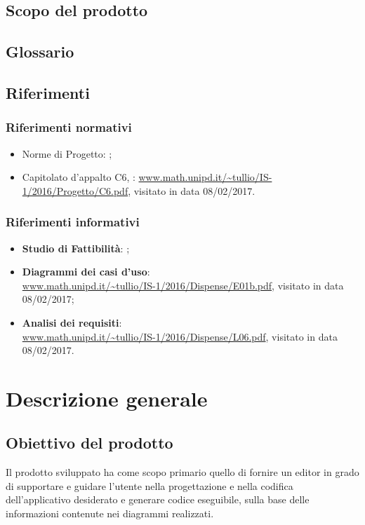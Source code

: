\subsection{Scopo del prodotto}
\scopo

\subsection{Glossario}
\presgloss

\subsection{Riferimenti}
\subsubsection{Riferimenti normativi}
\begin{itemize}
	\item Norme di Progetto: \NdP;
	\item Capitolato d'appalto C6, \proj: \url{www.math.unipd.it/~tullio/IS-1/2016/Progetto/C6.pdf}, visitato in data 08/02/2017.
\end{itemize}

\subsubsection{Riferimenti informativi}
\begin{itemize}
	\item \textbf{Studio di Fattibilità}: \SdF;
	\item \textbf{Diagrammi dei casi d'uso}: \\
	\url{www.math.unipd.it/~tullio/IS-1/2016/Dispense/E01b.pdf}, visitato in data 08/02/2017;
	\item \textbf{Analisi dei requisiti}: \\
	\url{www.math.unipd.it/~tullio/IS-1/2016/Dispense/L06.pdf}, visitato in data 08/02/2017.
\end{itemize}






\section{Descrizione generale}

\subsection{Obiettivo del prodotto}
Il prodotto sviluppato ha come scopo primario quello di fornire un editor in grado di supportare e guidare l'utente nella progettazione e nella codifica dell'applicativo desiderato e generare codice eseguibile, sulla base delle informazioni contenute nei diagrammi realizzati.

